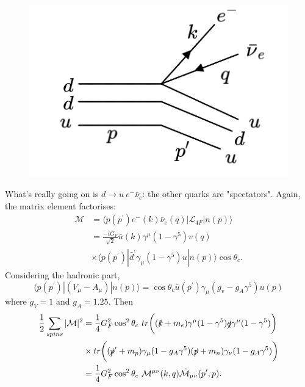 \documentclass[a4paper,12pt]{article}
\begin{document}
\begin{figure}
  \centering
  \includegraphics[width=\linewidth]{figs/diag_3.png}
\end{figure}
What's really going on is $d \to u\ e^- \bar{\nu}_e$: the other quarks are "spectators". Again, the matrix element factorises:
\begin{equation}
\begin{split}
    \mathcal{M} &= \langle p(p^\prime) e^-(k)\bar{\nu}_e(q) | \mathcal{L}_{4F} | n(p) \rangle \\
    &= \frac{-iG_F}{\sqrt{2}} \bar{u}(k)\gamma^\mu(1-\gamma^5)v(q)\\
    &\times \langle p(p^\prime) | \bar{d}^\prime\gamma_\mu(1-\gamma^5)u | n(p) \rangle \cos\theta_c.
\end{split}
\end{equation}
Considering the hadronic part,
\begin{equation}
\langle p(p^\prime) | (V_\mu - A_\mu) | n(p) \rangle = \cos\theta_c\bar{u}(p^\prime)\gamma_\mu(g_v-g_A\gamma^5)u(p)
\end{equation}
where $g_V =1$ and $g_A = 1.25$. Then 
\begin{equation}
\begin{split}
\frac{1}{2}\sum_{spins}|\mathcal{M}|^2 &= \frac{1}{4}G_F^2\cos^2\theta_c\ tr\bigg((\slashed{k} + m_e)\gamma^\mu(1-\gamma^5)\slashed{q}\gamma^\mu(1-\gamma^5)\bigg)\\
&\times tr\bigg((\slashed{p}^\prime + m_p) \gamma_\mu(1-g_A\gamma^5)(\slashed{p}+m_n)\gamma_\nu(1-g_A\gamma^5)\bigg) \\
&= \frac{1}{4}G_F^2\cos^2\theta_c\ \mathcal{M}^{\mu\nu}(k,q)\tilde{\mathcal{M}}_{\mu\nu}(p^\prime,p).
\end{split}
\end{equation}
\end{document}
